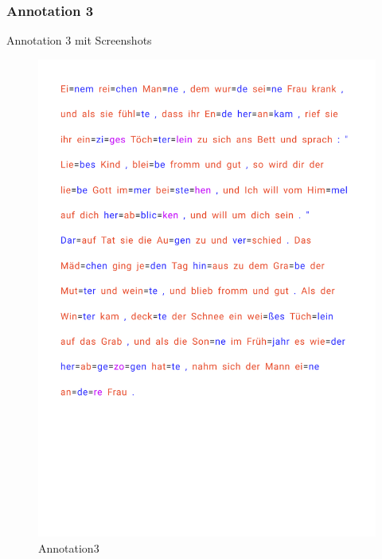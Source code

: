 \subsubsection{Annotation 3}
Annotation 3 mit Screenshots
\begin{figure}[h!]
	\centering
	\includegraphics[width=.7\linewidth, frame]{figures/evaluation/annotation3}
	\caption{Annotation3}
	\label{fig:frontend-home}
\end{figure}
\newpage

